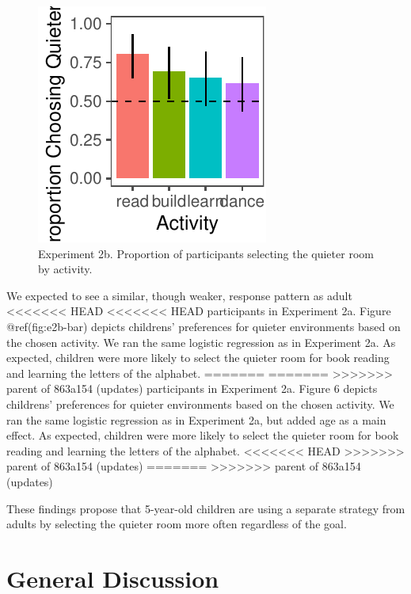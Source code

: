 \documentclass[10pt, letterpaper]{article}
\newenvironment{CodeChunk}{}{}
\begin{document}
\begin{CodeChunk}
\begin{figure}[H]

{\centering \includegraphics{figs/unnamed-chunk-4-1} 

}

\caption[Experiment 2b]{Experiment 2b. Proportion of participants selecting the quieter room by activity.}\label{fig:unnamed-chunk-4}
\end{figure}
\end{CodeChunk}

We expected to see a similar, though weaker, response pattern as adult
<<<<<<< HEAD
<<<<<<< HEAD
participants in Experiment 2a. Figure @ref(fig:e2b-bar) depicts
childrens' preferences for quieter environments based on the chosen
activity. We ran the same logistic regression as in Experiment 2a. As
expected, children were more likely to select the quieter room for book
reading and learning the letters of the alphabet.
=======
=======
>>>>>>> parent of 863a154 (updates)
participants in Experiment 2a. Figure 6 depicts childrens' preferences
for quieter environments based on the chosen activity. We ran the same
logistic regression as in Experiment 2a, but added age as a main effect.
As expected, children were more likely to select the quieter room for
book reading and learning the letters of the alphabet.
<<<<<<< HEAD
>>>>>>> parent of 863a154 (updates)
=======
>>>>>>> parent of 863a154 (updates)

These findings propose that 5-year-old children are using a separate
strategy from adults by selecting the quieter room more often regardless
of the goal.

\hypertarget{general-discussion}{%
\section{General Discussion}\label{general-discussion}}
\end{document}
